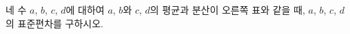 \noindent\begin{minipage}[t]{0.58\linewidth}\vspace{0pt}\raggedright 네 수 $a$, $b$, $c$, $d$에 대하여 $a$, $b$와 $c$, $d$의 평균과 분산이 오른쪽 표와 같을 때, $a$, $b$, $c$, $d$의 표준편차를 구하시오.\end{minipage}\hfill\begin{minipage}[t]{0.4\linewidth}\vspace{0pt}\centering \resizebox{\ifdim\width>\linewidth\linewidth\else\width\fi}{!}{}\end{minipage}\par
